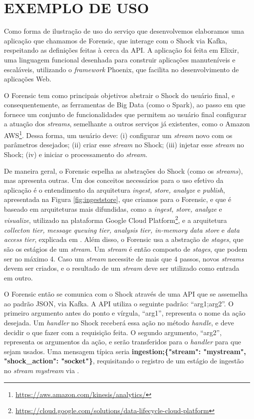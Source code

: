 \chapter[EXEMPLO DE USO]{EXEMPLO DE USO}
\label{chapter:example}

Como forma de ilustração de uso do serviço que desenvolvemos elaboramos uma
aplicação que chamamos de Forensic, que interage com o Shock via Kafka,
respeitando as definições feitas à cerca da API. A aplicação foi feita em
Elixir, uma linguagem funcional desenhada para construir aplicações
manuteníveis e escaláveis, utilizando o \textit{framework} Phoenix, que
facilita no desenvolvimento de aplicações Web.

O Forensic tem como principais objetivos abstrair o Shock do usuário final,
e consequentemente, as ferramentas de Big Data (como o Spark), ao passo em que
fornece um conjunto de funcionalidades que permitem ao usuário final configurar
a atuação dos \textit{streams}, semelhante a outros serviços já existentes,
como o Amazon AWS\footnote{\url{https://aws.amazon.com/kinesis/analytics/}}.
Dessa forma, um usuário deve: (i) configurar um \textit{stream} novo com os
parâmetros desejados; (ii) criar esse \textit{stream} no Shock; (iii) injetar
esse \textit{stream} no Shock; (iv) e iniciar o processamento do
\textit{stream}.

De maneira geral, o Forensic espelha as abstrações do Shock (como os
\textit{streams}), mas apresenta outras. Um dos conceitos necessários para o
uso efetivo da aplicação é o entendimento da arquitetura \textit{ingest, store,
analyze} e \textit{publish}, apresentada na Figura \ref{fig:ingeststore},
que criamos para o Forensic, e que é baseado em
arquiteturas mais difundidas, como a \textit{ingest, store, analyze} e
\textit{visualize}, utilizado na plataforma Google Cloud
Platform\footnote{\url{https://cloud.google.com/solutions/data-lifecycle-cloud-platform}},
e a arquitetura \textit{collecton tier, message queuing tier, analysis tier,
in-memory data store} e \textit{data access tier}, explicada em
. Além disso, o Forensic usa a abstração de
\textit{stages}, que são os estágios de um \textit{stream}. Um \textit{stream}
é então composto de \textit{stages}, que podem ser no máximo 4. Caso um
\textit{stream} necessite de mais que 4 passos, novos \textit{streams}
devem ser criados, e o resultado de um \textit{stream} deve ser utilizado
como entrada em outro.

O Forensic então se comunica com o Shock através de uma API que se assemelha
ao padrão JSON, via Kafka. A API utiliza o seguinte padrão: ``arg1;arg2''.
O primeiro argumento antes do ponto e vírgula, ``arg1'', representa o nome
da ação desejada. Um \textit{handler} no Shock receberá essa ação no método
\textit{handle}, e deve decidir o que fazer com a requisição feita. O segundo
argumento, ``arg2'', representa os argumentos da ação, e serão transferidos
para o \textit{handler} para que sejam usados. Uma mensagem típica seria
\textbf{ingestion;\{"stream": "mystream", "shock\_action": "socket"\}},
requisitando o registro de um estágio de ingestão no \textit{stream}
\textit{mystream} via .

